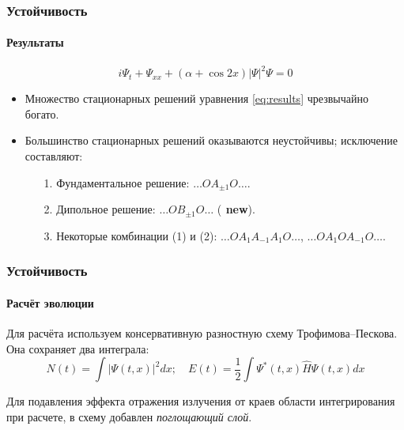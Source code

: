 \documentclass{beamer}
\begin{document}
\begin{frame}
	\frametitle{Устойчивость}
	\framesubtitle{Результаты\footnotemark[5]}
	
	\begin{equation}
		i \Psi_t + \Psi_{xx} + (\alpha + \cos 2x) |\Psi|^2 \Psi = 0
		\label{eq:results}	
	\end{equation}
	
	\begin{itemize}
		\item Множество стационарных решений уравнения \eqref{eq:results} чрезвычайно богато.
		\item Большинство стационарных решений оказываются неустойчивы; исключение составляют:
			\begin{enumerate}
				\item[1.] Фундаментальное решение: $\dots O A_{\pm 1} O \dots$.
				\item[2.] Дипольное решение: $\dots O B_{\pm 1} O \dots$ ({\bf {\color{red} new}}).
				\item[3.] Некоторые комбинации {\color{ceruleanblue} (1)} и {\color{ceruleanblue} (2)}: $\dots O A_1 A_{-1} A_1 O \dots$, $\dots O A_1 O A_{-1} O \dots$.
			\end{enumerate}
	\end{itemize}
	
\end{frame}

\begin{frame}
	\frametitle{Устойчивость}
	\framesubtitle{Расчёт эволюции}
	
	Для расчёта используем консервативную разностную схему Трофимова--Пескова\footnotemark[6].
	Она сохраняет два интеграла:
	\begin{equation}
		N(t) = \int |\Psi(t, x)|^2 dx; \quad
		E(t) = \dfrac{1}{2} \int \Psi^*(t, x) \widehat{H} \Psi(t, x) dx
	\end{equation}

	Для подавления эффекта отражения излучения от краев области интегрирования при расчете, в схему добавлен {\it {\color{ceruleanblue} поглощающий слой}}. 
	
\end{frame}
\end{document}

